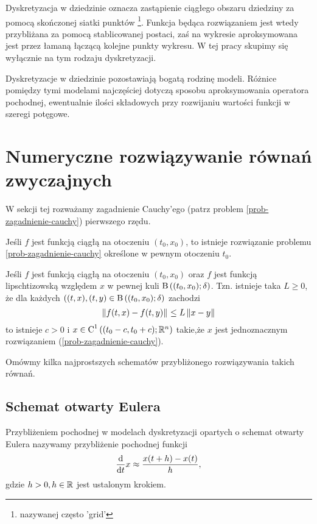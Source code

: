 \documentclass[12pt,a4paper]{report}
\begin{document}
Dyskretyzacja w dziedzinie oznacza zastąpienie ciągłego obszaru dziedziny za pomocą skończonej siatki punktów \footnote{nazywanej często 'grid'}. Funkcja będąca rozwiązaniem jest wtedy przybliżana za pomocą stablicowanej postaci, zaś na wykresie aproksymowana jest przez łamaną łączącą kolejne punkty wykresu. W tej pracy skupimy się wyłącznie na tym rodzaju dyskretyzacji. 

Dyskretyzacje w dziedzinie pozostawiają bogatą rodzinę modeli. Różnice pomiędzy tymi modelami najczęściej dotyczą sposobu aproksymowania operatora pochodnej, ewentualnie ilości składowych przy rozwijaniu wartości funkcji w szeregi potęgowe. 


\section{Numeryczne rozwiązywanie równań zwyczajnych}

W sekcji tej rozważamy zagadnienie Cauchy'ego (patrz problem \ref{prob-zagadnienie-cauchy}) pierwszego rzędu. 


\begin{theorem}[Peano]
Jeśli $f$ jest funkcją ciągłą na otoczeniu $(t_{0},x_{0})$, to istnieje rozwiązanie problemu \ref{prob-zagadnienie-cauchy} określone w pewnym otoczeniu $t_{0}$. 
\end{theorem}

\begin{theorem}
Jeśli $f$ jest funkcją ciągłą na otoczeniu $(t_{0},x_{0})$ oraz $f$ jest funkcją lipschtizowską względem $x$ w pewnej kuli $\ball{(t_0,x_0)}{\delta}$. Tzn.
 istnieje taka $L\geq 0$, że dla każdych $((t,x),(t,y) \in \ball{(t_0,x_0)}{\delta} $ zachodzi
$$
  \left\| {f(t,x) - f(t,y)} \right\|_{} \leq L \left\| { x-y} \right\|_{} 
$$
 to istnieje $ c> 0 $ i $x \in \Ck{1}{(t_0-c,t_0+c); \setR^{n} }  $ takie,że $x$ jest jednoznacznym rozwiązaniem (\ref{prob-zagadnienie-cauchy}).
\end{theorem}


Omówmy kilka najprostszych schematów przybliżonego rozwiązywania takich równań.

\subsection{Schemat otwarty Eulera}

\begin{definition}
Przybliżeniem pochodnej w modelach dyskretyzacji opartych o schemat otwarty Eulera nazywamy przybliżenie pochodnej funkcji
$$
\frac{\mathrm{d} {} }{\mathrm{d}{t}}x \approx \frac{x(t+h) - x(t)}{h},
$$
gdzie $h >0, h \in \mathbb{R} $ jest ustalonym krokiem. 
\end{definition}
\end{document}
